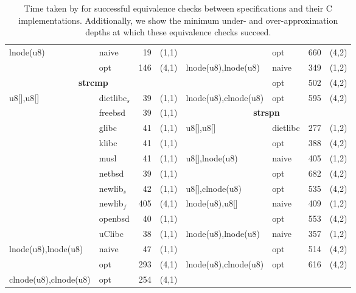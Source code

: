 \begin{table}
\begin{center}
\begin{scriptsize}
\begin{tabular}{@{\hspace{5mm}}l@{\hspace{5px}}l@{\hspace{4mm}}r@{\hspace{4mm}}c@{\hspace{8mm}}l@{\hspace{5px}}l@{\hspace{4mm}}r@{\hspace{4mm}}c@{\hspace{5mm}}}
lnode(u8) & naive & 19 & (1,1) &                             & opt & 660 & (4,2) \\
            & opt & 146 & (4,1) &                            lnode(u8),lnode(u8) & naive & 349 & (1,2) \\
\multicolumn{4}{c}{\bf strcmp}   &                           & opt & 502 & (4,2) \\
u8[],u8[] & dietlibc$_s$ & 39 & (1,1) &      lnode(u8),clnode(u8) & opt & 595 & (4,2) \\
       & freebsd & 39 & (1,1) &                              \multicolumn{4}{c}{\bf strspn} \\
       & glibc & 41 & (1,1) &                                u8[],u8[] & dietlibc & 277 & (1,2) \\
       & klibc & 41 & (1,1) &                                & opt      & 388 & (4,2) \\
       & musl & 41 & (1,1) &                                 u8[],lnode(u8) & naive & 405 & (1,2) \\
       & netbsd & 39 & (1,1) &                               & opt & 682 & (4,2) \\
       & newlib$_s$ & 42 & (1,1) &            u8[],clnode(u8) & opt & 535 & (4,2) \\
       & newlib$_f$ & 405 & (4,1) &            lnode(u8),u8[] & naive & 409 & (1,2) \\
       & openbsd & 40 & (1,1) &                              & opt & 553 & (4,2) \\
       & uClibc & 38 & (1,1) &                               lnode(u8),lnode(u8) & naive & 357 & (1,2) \\
lnode(u8),lnode(u8) & naive & 47 & (1,1) &                   & opt & 514 & (4,2) \\
            & opt & 293 & (4,1) &                            lnode(u8),clnode(u8) & opt & 616 & (4,2) \\
clnode(u8),clnode(u8) & opt & 254 & (4,1) &                  & & & \\
\bottomrule
\end{tabular}
\end{scriptsize}
\end{center}
\caption{\label{tab:results}Time taken by \toolName{} for successful equivalence checks between specifications and their C implementations.
Additionally, we show the minimum under- and over-approximation depths at which these equivalence checks succeed.}
\end{table}